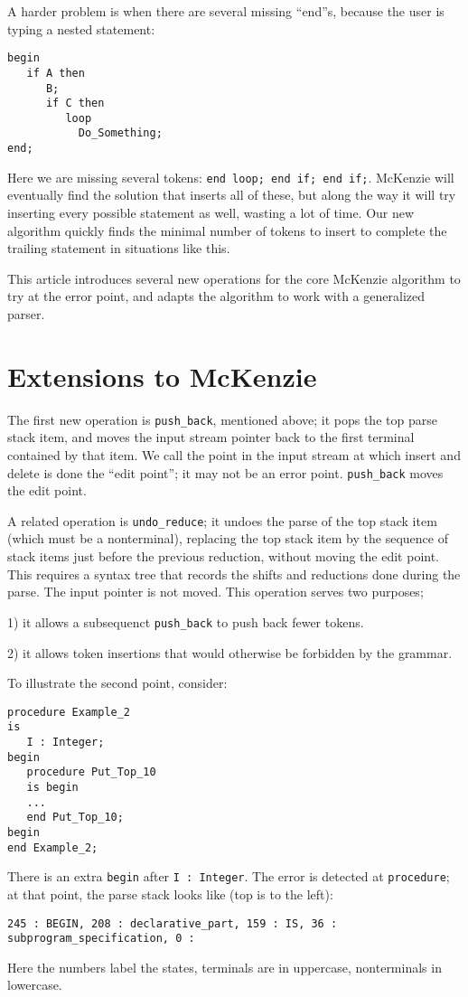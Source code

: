 \documentclass{article}
\begin{document}
A harder problem is when there are several missing ``end''s, because
the user is typing a nested statement:
\begin{verbatim}
begin
   if A then
      B;
      if C then
         loop
           Do_Something;
end;
\end{verbatim}

Here we are missing several tokens: \verb|end loop; end if; end if;|.
McKenzie will eventually find the solution that inserts all of these,
but along the way it will try inserting every possible statement as
well, wasting a lot of time. Our new algorithm quickly finds the
minimal number of tokens to insert to complete the trailing statement
in situations like this.

This article introduces several new operations for the core McKenzie
algorithm to try at the error point, and adapts the algorithm to work
with a generalized parser.


\section{Extensions to McKenzie}

The first new operation is \verb|push_back|, mentioned above; it pops
the top parse stack item, and moves the input stream pointer back to
the first terminal contained by that item. We call the point in the
input stream at which insert and delete is done the ``edit point''; it
may not be an error point. \verb|push_back| moves the edit point.

A related operation is \verb|undo_reduce|; it undoes the parse of the
top stack item (which must be a nonterminal), replacing the top stack
item by the sequence of stack items just before the previous
reduction, without moving the edit point. This requires a syntax tree
that records the shifts and reductions done during the parse. The
input pointer is not moved. This operation serves two purposes;

1) it allows a subsequenct \verb|push_back| to push back fewer tokens.

2) it allows token insertions that would otherwise be forbidden by the
grammar.

To illustrate the second point, consider:
\begin{verbatim}
procedure Example_2
is
   I : Integer;
begin
   procedure Put_Top_10
   is begin
   ...
   end Put_Top_10;
begin
end Example_2;
\end{verbatim}
There is an extra \verb|begin| after
\verb|I : Integer|. The error is detected at \verb|procedure|; at that point,
the parse stack looks like (top is to the left):
\begin{verbatim}
245 : BEGIN, 208 : declarative_part, 159 : IS, 36 : subprogram_specification, 0 :
\end{verbatim}
Here the numbers label the states, terminals are in uppercase,
nonterminals in lowercase.
\end{document}
